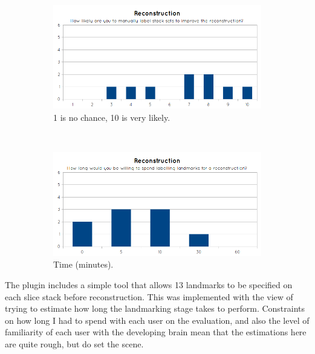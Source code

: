 \begin{figure}[H]
  \centering
  \begin{subfigure}[b]{0.5\textwidth}
    \includegraphics[width=\textwidth]{images/evaluation/graph_reconstruction_2.png}
    \caption{1 is no chance, 10 is very likely.}
    \label{fig:graph_reconstruction_2}
  \end{subfigure}%
  ~ %
  \begin{subfigure}[b]{0.5\textwidth}
    \includegraphics[width=\textwidth]{images/evaluation/graph_reconstruction_3.png}
    \caption{Time (minutes).}
    \label{fig:graph_reconstruction_3}
  \end{subfigure}
  \caption{}\label{fig:graph_reconstruction23}
\end{figure}

The plugin includes a simple tool that allows 13 landmarks to be specified on each slice stack before reconstruction. This was implemented with the view of trying to estimate how long the landmarking stage takes to perform. Constraints on how long I had to spend with each user on the evaluation, and also the level of familiarity of each user with the developing brain mean that the estimations here are quite rough, but do set the scene.

